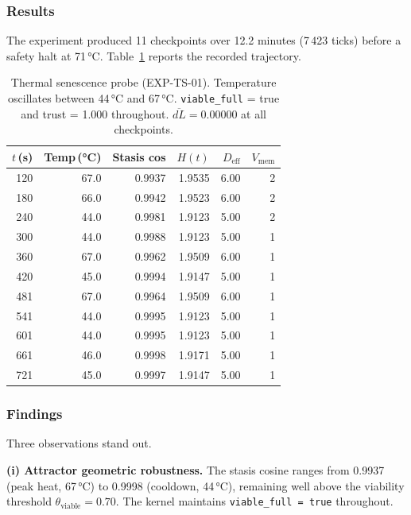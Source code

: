 \documentclass[11pt, a4paper]{article}
\begin{document}
\subsubsection*{Results}

The experiment produced 11 checkpoints over 12.2 minutes (7\,423 ticks) before a
safety halt at 71\,°C.
Table~\ref{tab:thermal_senescence} reports the recorded trajectory.

\begin{table}[h]
\centering
\small
\begin{tabular}{rrrrrr}
\toprule
$t$\,(s) & Temp\,(°C) & Stasis cos & $H(t)$ & $D_\text{eff}$ & $V_\text{mem}$ \\
\midrule
120 & 67.0 & 0.9937 & 1.9535 & 6.00 & 2 \\
180 & 66.0 & 0.9942 & 1.9523 & 6.00 & 2 \\
240 & 44.0 & 0.9981 & 1.9123 & 5.00 & 2 \\
300 & 44.0 & 0.9988 & 1.9123 & 5.00 & 1 \\
360 & 67.0 & 0.9962 & 1.9509 & 6.00 & 1 \\
420 & 45.0 & 0.9994 & 1.9147 & 5.00 & 1 \\
481 & 67.0 & 0.9964 & 1.9509 & 6.00 & 1 \\
541 & 44.0 & 0.9995 & 1.9123 & 5.00 & 1 \\
601 & 44.0 & 0.9995 & 1.9123 & 5.00 & 1 \\
661 & 46.0 & 0.9998 & 1.9171 & 5.00 & 1 \\
721 & 45.0 & 0.9997 & 1.9147 & 5.00 & 1 \\
\bottomrule
\end{tabular}
\caption{Thermal senescence probe (EXP-TS-01).
Temperature oscillates between 44\,°C and 67\,°C.
\texttt{viable\_full} = true and trust = 1.000 throughout.
$\overline{dL} = 0.00000$ at all checkpoints.}
\label{tab:thermal_senescence}
\end{table}

\subsubsection*{Findings}

Three observations stand out.

\textbf{(i) Attractor geometric robustness.}
The stasis cosine ranges from 0.9937 (peak heat, 67\,°C) to 0.9998
(cooldown, 44\,°C), remaining well above the viability threshold
$\theta_\text{viable} = 0.70$.
The kernel maintains \texttt{viable\_full = true} throughout.
\end{document}
